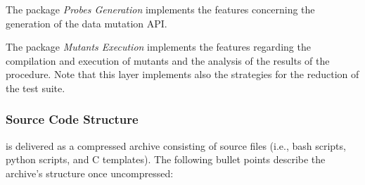 The package \textit{Probes Generation} implements the features concerning the generation of the data mutation API.

The package \textit{Mutants Execution} implements the features regarding the compilation and execution of mutants and the analysis of the results of the \dama procedure. Note that this layer implements also the strategies for the reduction of the test suite.

\subsubsection{Source Code Structure}


\dama is delivered as a compressed archive consisting of source files (i.e., bash scripts, python scripts, and C templates).
The following bullet points describe the archive's structure once uncompressed:

